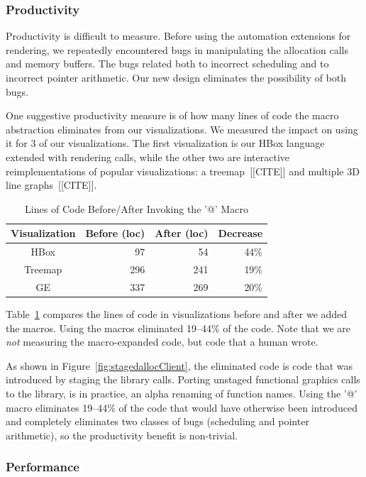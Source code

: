 \subsubsection{Productivity}
Productivity is difficult to measure. Before using the automation extensions for rendering, we repeatedly encountered bugs in manipulating the allocation calls and memory buffers. The bugs related both to incorrect scheduling and to incorrect pointer arithmetic. Our new design eliminates the possibility of both bugs.

One suggestive productivity measure is of how many lines of code the macro abstraction eliminates from our visualizations. We measured the impact on using it for 3 of our visualizations. The first visualization is our HBox language extended with rendering calls, while the other two are interactive reimplementations of popular visualizations: a treemap~[[CITE]] and multiple 3D line graphs~[[CITE]].


\begin{table}[ht]
\caption{Lines of Code Before/After Invoking the '@' Macro}
\centering
\begin{tabular}{c r r r}
\hline\hline
 \textbf{Visualization} & \textbf{Before (loc)} & \textbf{After (loc)} & \textbf{Decrease} \\ [0.5ex] \hline
  HBox & 97 & 54 & 44\% \\
  Treemap & 296 & 241 & 19\% \\
  GE & 337 & 269 & 20\% \\ [1ex] 
\hline
\end{tabular}
\label{table:macroreduction}
\end{table}
Table~\ref{table:macroreduction} compares the lines of code in visualizations before and after we added the macros. Using the macros eliminated 19--44\% of the code. Note that we are \emph{not} measuring the macro-expanded code, but code that a human wrote.



As shown in Figure~\ref{fig:stagedallocClient}, the eliminated code is code that was introduced by staging the library calls. Porting unstaged functional graphics calls to the library, is in practice, an alpha renaming of function names.  Using the '@' macro eliminates 19--44\% of the code that would have otherwise been introduced and completely eliminates two classes of bugs (scheduling and pointer arithmetic), so the productivity benefit is non-trivial. 

\subsubsection{Performance}

